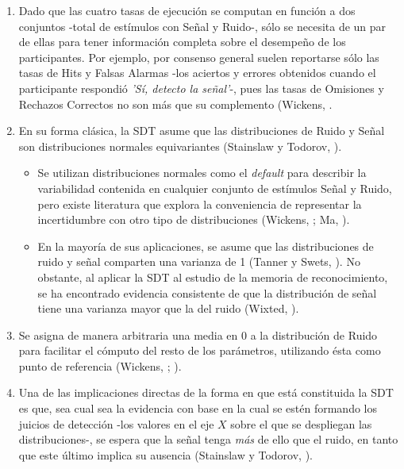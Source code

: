 \begin{enumerate}

\item  Dado que las cuatro tasas de ejecución se computan en función a dos conjuntos -total de estímulos con Señal y Ruido-, sólo se necesita de un par de ellas para tener información completa sobre el desempeño de los participantes. Por ejemplo, por consenso general suelen reportarse sólo las tasas de Hits y Falsas Alarmas -los aciertos y errores obtenidos cuando el participante respondió \textit{'Sí, detecto la señal'}-, pues las tasas de Omisiones y Rechazos Correctos no son más que su complemento (Wickens, \citeyear{Wickens1}.\\

\item En su forma clásica, la SDT asume que las distribuciones de Ruido y Señal son distribuciones normales equivariantes (Stainslaw y Todorov, \citeyear{Stainslaw1999}).\\
  \begin{itemize}
  \item Se utilizan distribuciones normales como el \textit{default} para describir la variabilidad contenida en cualquier conjunto de estímulos Señal y Ruido, pero existe literatura que explora la conveniencia de representar la incertidumbre con otro tipo de distribuciones (Wickens, \citeyear{Wickens1}; Ma, \citeyear{WeijiMa2009}).\\
  \item En la mayoría de sus aplicaciones, se asume que las distribuciones de ruido y señal comparten una varianza de 1 (Tanner y Swets, \citeyear{Tanner1954}). No obstante, al aplicar la SDT al estudio de la memoria de reconocimiento, se ha encontrado evidencia consistente de que la distribución de señal tiene una varianza mayor que la del ruido (Wixted, \citeyear{Wixted2007}).\\
  \end{itemize}

\item Se asigna de manera arbitraria una media en 0 a la distribución de Ruido para facilitar el cómputo del resto de los parámetros, utilizando ésta como punto de referencia (Wickens, \citeyear{Wickens1}; \citeyear{Gescheider}).\\

\item Una de las implicaciones directas de la forma en que está constituida la SDT es que, sea cual sea la evidencia con base en la cual se estén formando los juicios de detección -los valores en el eje $X$ sobre el que se despliegan las distribuciones-, se espera que la señal tenga \textit{más} de ello que el ruido, en tanto que este último implica su ausencia (Stainslaw y Todorov, \citeyear{Stainslaw1999}).\\
  \begin{itemize}


\end{itemize}
\end{enumerate}

